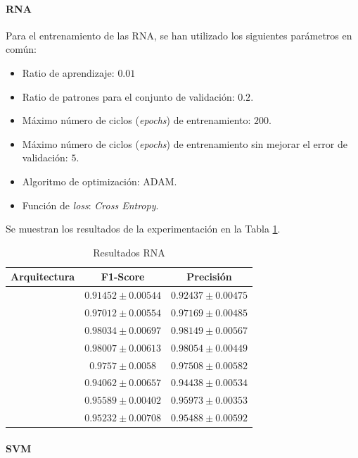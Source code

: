 \documentclass[12pt]{article}
\begin{document}
\paragraph{RNA}

Para el entrenamiento de las RNA, se han utilizado los siguientes parámetros en común:
\begin{itemize}
	\item Ratio de aprendizaje: $0.01$
	\item Ratio de patrones para el conjunto de validación: $0.2$.
	\item Máximo número de ciclos (\textit{epochs}) de entrenamiento: $200$.
	\item Máximo número de ciclos (\textit{epochs}) de entrenamiento sin mejorar el error de validación: $5$.
	\item Algoritmo de optimización: ADAM.
	\item Función de \textit{loss}: \textit{Cross Entropy}.
\end{itemize}

Se muestran los resultados de la experimentación en la Tabla \ref{Tab:ANN_5}.

\begin{table}[!ht]
	\caption{Resultados RNA}
	\centering
		\begin{tabular}{||c c c||}
			\hline
			Arquitectura & F1-Score & Precisión \\ [0.5ex]
			\hline\hline
			[16] & $0.91452 \pm 0.00544$ & $0.92437 \pm 0.00475$ \\
			\hline 
			[32] & $0.97012 \pm 0.00554$ & $0.97169 \pm 0.00485$ \\
			\hline 
			[64] & $0.98034 \pm 0.00697$ & $0.98149 \pm 0.00567$ \\
			\hline 
			[128] & $0.98007 \pm 0.00613$ & $0.98054 \pm 0.00449$ \\
			\hline 
			[256] & $0.9757 \pm 0.0058$ & $0.97508 \pm 0.00582$ \\
			\hline 
			[512] & $0.94062 \pm 0.00657$ & $0.94438 \pm 0.00534$ \\
			\hline 
			[64, 64] & $0.95589 \pm 0.00402$ & $0.95973 \pm 0.00353$ \\
			\hline 
			[64, 128] & $0.95232 \pm 0.00708$ & $0.95488 \pm 0.00592$ \\
			\hline 
		\end{tabular}
	\label{Tab:ANN_5}
	\end{table}

\paragraph{SVM}
\end{document}
